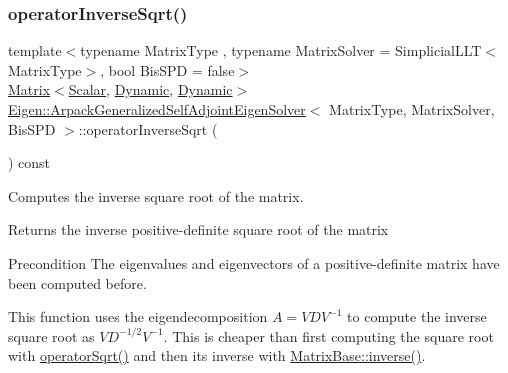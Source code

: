 \mbox{\label{class_eigen_1_1_arpack_generalized_self_adjoint_eigen_solver_ad55f052b675f1deaea220d0cc225622a}} 
\subsubsection{\texorpdfstring{operator\+Inverse\+Sqrt()}{operatorInverseSqrt()}\hspace{0.1cm}{\footnotesize\ttfamily [1/2]}}
{\footnotesize\ttfamily template$<$typename Matrix\+Type , typename Matrix\+Solver  = Simplicial\+L\+L\+T$<$\+Matrix\+Type$>$, bool Bis\+S\+PD = false$>$ \\
\hyperlink{group___core___module_class_eigen_1_1_matrix}{Matrix}$<$\hyperlink{class_eigen_1_1_arpack_generalized_self_adjoint_eigen_solver_ab1182405bfe87a505d4b7a8311c661ec}{Scalar}, \hyperlink{namespace_eigen_ad81fa7195215a0ce30017dfac309f0b2}{Dynamic}, \hyperlink{namespace_eigen_ad81fa7195215a0ce30017dfac309f0b2}{Dynamic}$>$ \hyperlink{class_eigen_1_1_arpack_generalized_self_adjoint_eigen_solver}{Eigen\+::\+Arpack\+Generalized\+Self\+Adjoint\+Eigen\+Solver}$<$ Matrix\+Type, Matrix\+Solver, Bis\+S\+PD $>$\+::operator\+Inverse\+Sqrt (\begin{DoxyParamCaption}{ }\end{DoxyParamCaption}) const\hspace{0.3cm}{\ttfamily [inline]}}



Computes the inverse square root of the matrix. 

\begin{DoxyReturn}{Returns}
the inverse positive-\/definite square root of the matrix
\end{DoxyReturn}
\begin{DoxyPrecond}{Precondition}
The eigenvalues and eigenvectors of a positive-\/definite matrix have been computed before.
\end{DoxyPrecond}
This function uses the eigendecomposition $ A = V D V^{-1} $ to compute the inverse square root as $ V D^{-1/2} V^{-1} $. This is cheaper than first computing the square root with \hyperlink{class_eigen_1_1_arpack_generalized_self_adjoint_eigen_solver_a7522aad061ebccc065b254c0bc67d3b0}{operator\+Sqrt()} and then its inverse with \hyperlink{group___core___module_a7712eb69e8ea3c8f7b8da1c44dbdeebf}{Matrix\+Base\+::inverse()}.

